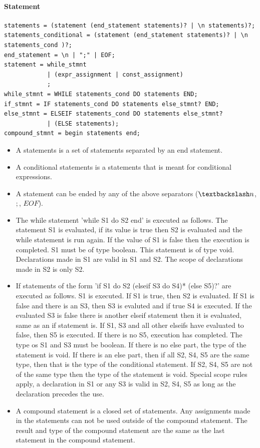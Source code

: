 \documentclass[paper=a4, fontsize=11pt]{article}
\numberwithin{equation}{section}		%
\numberwithin{figure}{section}			%
\numberwithin{table}{section}				%
\begin{document}
\paragraph{Statement}
\begin{verbatim}
statements = (statement (end_statement statements)? | \n statements)?;
statements_conditional = (statement (end_statement statements)? | \n statements_cond )?;
end_statement = \n | ";" | EOF;
statement = while_stmnt 
			| (expr_assignment | const_assignment) 
			;
while_stmnt = WHILE statements_cond DO statements END;
if_stmnt = IF statements_cond DO statements else_stmnt? END;
else_stmnt = ELSEIF statements_cond DO statements else_stmnt?
			| (ELSE statements);
compound_stmnt = begin statements end;
\end{verbatim}
\begin{itemize}
\item A statements is a set of statements separated by an end statement.
\item A conditional statements is a statements that is meant for conditional expressions.
\item A statement can be ended by any of the above separators ($\textbackslash n$, $;$, $EOF$).
\item The while statement 'while S1 do S2 end' is executed as follows. The statement S1 is evaluated, if its value is true then S2 is evaluated and the while statement is run again. If the value of S1 is false then the execution is completed. S1 must be of type boolean. This statement is of type void. Declarations made in S1 are valid in S1 and S2. The scope of declarations made in S2 is only S2.

\item If statements of the form 'if S1 do S2 (elseif S3 do S4)* (else S5)?' are executed as follows. S1 is executed. If S1 is true, then S2 is evaluated. If S1 is false and there is an S3, then S3 is evaluted and if true S4 is executed. If the evaluated S3 is false there is another elseif statement then it is evaluated, same as an if statement is. If S1, S3 and all other elseifs have evaluated to false, then S5 is executed. If there is no S5, execution has completed. The type os S1 and S3 must be boolean. If there is no else part, the type of the statement is void. If there is an else part, then if all S2, S4, S5 are the same type, then that is the type of the conditional statement. If S2, S4, S5 are not of the same type then the type of the statement is void. Special scope rules apply, a declaration in S1 or any S3 is valid in S2, S4, S5 as long as the declaration precedes the use. 
\item A compound statement is a closed set of statements. Any assignments made in the statements can not be used outside of the compound statement. The result and type of the compound statement are the same as the last statement in the compound statement.

\end{itemize}
\end{document}
